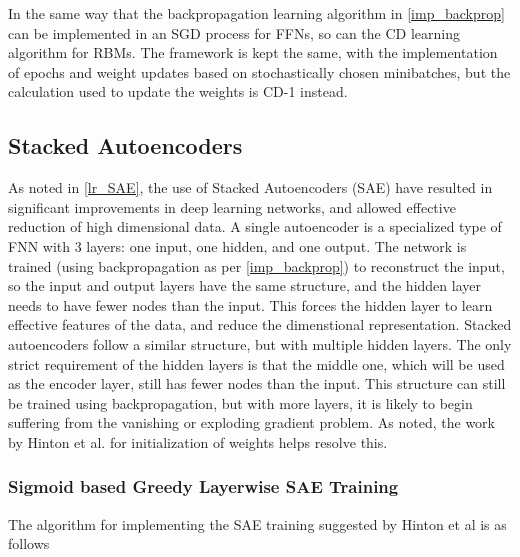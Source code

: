 \documentclass[a4paper,latin]{paper}
\begin{document}
In the same way that the backpropagation learning algorithm in \ref{imp_backprop} can be implemented in an SGD process for FFNs, so can the CD learning algorithm for RBMs. The framework is kept the same, with the implementation of epochs and weight updates based on stochastically chosen minibatches, but the calculation used to update the weights is CD-1 instead.


\subsection{Stacked Autoencoders}\label{imp_SAE}

As noted in \ref{lr_SAE}, the use of Stacked Autoencoders (SAE) have resulted in significant improvements in deep learning networks, and allowed effective reduction of high dimensional data. A single autoencoder is a specialized type of FNN with 3 layers: one input, one hidden, and one output. The network is trained (using backpropagation as per \ref{imp_backprop}) to reconstruct the input, so the input and output layers have the same structure, and the hidden layer needs to have fewer nodes than the input. This forces the hidden layer to learn effective features of the data, and reduce the dimenstional representation. 
\newline\newline
Stacked autoencoders follow a similar structure, but with multiple hidden layers. The only strict requirement of the hidden layers is that the middle one, which will be used as the encoder layer, still has fewer nodes than the input. This structure can still be trained using backpropagation, but with more layers, it is likely to begin suffering from the vanishing or exploding gradient problem. As noted, the work by Hinton et al. for initialization of weights helps resolve this.

\subsubsection{Sigmoid based Greedy Layerwise SAE Training}\label{imp_sigmoidsae}

The algorithm for implementing the SAE training suggested by Hinton et al is as follows
\end{document}
